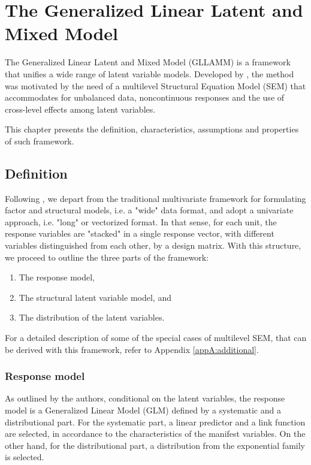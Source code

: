 \chapter{The Generalized Linear Latent and Mixed Model} \label{chap:framework}

The Generalized Linear Latent and Mixed Model (GLLAMM) is a framework that unifies a wide range of latent variable models. Developed by \citet{Rabe_et_al_2004a, Rabe_et_al_2004b, Rabe_et_al_2004c, Skrondal_et_al_2004a, Rabe_et_al_2012}, the method was motivated by the need of a multilevel Structural Equation Model (SEM) that accommodates for unbalanced data, noncontinuous responses and the use of cross-level effects among latent variables. 

This chapter presents the definition, characteristics, assumptions and properties of such framework.


\section{Definition} \label{sect:definition}
Following \citet{Rabe_et_al_2004a, Rabe_et_al_2012}, we depart from the traditional multivariate framework for formulating factor and structural models, i.e. a "wide" data format, and adopt a univariate approach, i.e. "long" or vectorized format. In that sense, for each unit, the response variables are "stacked" in a single response vector, with different variables distinguished from each other, by a design matrix. With this structure, we proceed to outline the three parts of the framework: 
\begin{enumerate}
	\item The response model, 
	\item The structural latent variable model, and 
	\item The distribution of the latent variables. 
\end{enumerate}
For a detailed description of some of the special cases of multilevel SEM, that can be derived with this framework, refer to Appendix \ref{appA:additional}.


\subsection{Response model} \label{s_sect:response}
As outlined by the authors, conditional on the latent variables, the response model is a Generalized Linear Model (GLM) defined by a systematic and a distributional part. For the systematic part, a linear predictor and a link function are selected, in accordance to the characteristics of the manifest variables. On the other hand, for the distributional part, a distribution from the exponential family is selected.

